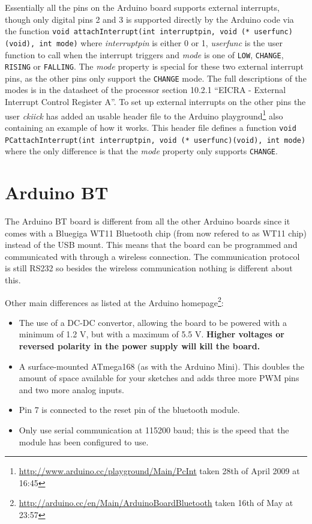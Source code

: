 \documentclass[a4paper, oneside, final]{memoir}
\begin{document}
Essentially all the pins on the Arduino board supports external
interrupts, though only digital pins 2 and 3 is supported directly by
the Arduino code via the function \texttt{void attachInterrupt(int
  interruptpin, void (* userfunc)(void), int mode)} where
\textit{interruptpin} is either 0 or 1, \textit{userfunc} is the user
function to call when the interrupt triggers and \textit{mode} is one
of \texttt{LOW}, \texttt{CHANGE}, \texttt{RISING} or
\texttt{FALLING}. The \textit{mode} property is special for these two
external interrupt pins, as the other pins only support the
\texttt{CHANGE} mode. The full descriptions of the modes is in the
datasheet of the processor section 10.2.1 ``EICRA - External Interrupt
Control Register A''. To set up external interrupts on the other pins
the user \textit{ckiick} has added an usable header file to the Arduino
playground\footnote{\url{http://www.arduino.cc/playground/Main/PcInt}
  taken 28th of April 2009 at 16:45} also containing an
example of how it works. This header file defines a function
\texttt{void PCattachInterrupt(int interruptpin, void (*
  userfunc)(void), int mode)} where the only difference is that the
\textit{mode} property only supports \texttt{CHANGE}.



\section{Arduino BT}

The Arduino BT board is different from all the other Arduino boards since it
comes with a Bluegiga WT11 Bluetooth chip (from now refered to as WT11 chip)
instead of the USB mount. This means that the board can be programmed and
communicated with through a wireless connection. The communication protocol is
still RS232 so besides the wireless communication nothing is different about
this.

Other main differences as listed at the Arduino
homepage\footnote{\url{http://arduino.cc/en/Main/ArduinoBoardBluetooth} taken
  16th of May at 23:57}:

\begin{itemize}
\item The use of a DC-DC convertor, allowing the board to be powered with a
  minimum of 1.2 V, but with a maximum of 5.5 V. \textbf{Higher voltages or
    reversed polarity in the power supply will kill the board.}

\item A surface-mounted ATmega168 (as with the Arduino Mini). This doubles the
  amount of space available for your sketches and adds three more PWM pins and
  two more analog inputs.

\item Pin 7 is connected to the reset pin of the bluetooth module. 

\item Only use serial communication at 115200 baud; this is the speed that the
  module has been configured to use.
\end{itemize}
\end{document}
